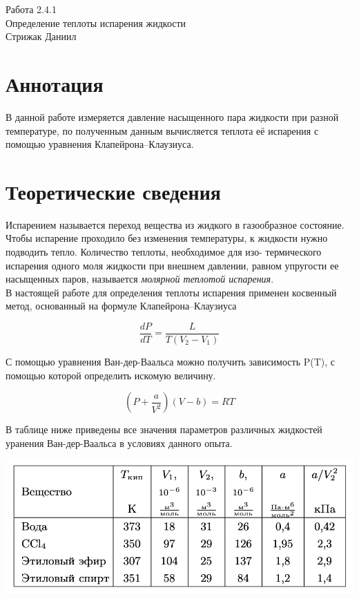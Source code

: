 



\begin{center}
  \LARGE{Работа 2.4.1}\\[0.2cm]
  \LARGE{Определение теплоты испарения жидкости}\\[0.2cm]
  \large{Стрижак Даниил}\\[0.2cm]
\end{center}  
  

\section{Аннотация}

В данной работе измеряется давление насыщенного пара жидкости при разной температуре, по полученным данным вычисляется теплота её испарения с помощью уравнения Клапейрона–Клаузиуса.

\section{Теоретические сведения}
Испарением называется переход вещества из жидкого в газообразное состояние. Чтобы испарение проходило без изменения температуры, к жидкости нужно подводить тепло. Количество теплоты, необходимое для изо- термического испарения одного моля жидкости при внешнем давлении, равном упругости ее насыщенных паров, называется \textit{молярной теплотой испарения}. \\
В настоящей работе для определения теплоты испарения применен косвенный метод, основанный на формуле Клапейрона--Клаузиуса

\begin{equation*}
\frac{dP}{dT}=\frac{L}{T(V_2-V_1)}
\end{equation*}

С помощью уравнения Ван-дер-Ваальса можно получить зависимость P(T), с помощью которой определить искомую величину. 

\begin{equation*}
(P+\frac{a}{V^2})(V-b)=RT
\end{equation*}

В таблице ниже приведены все значения параметров различных жидкостей уранения Ван-дер-Ваальса в условиях данного опыта. 

\begin{center}

  \includegraphics[width=0.7\linewidth]{1.jpg}\\
 
   \\
  
 \end{center}
 
